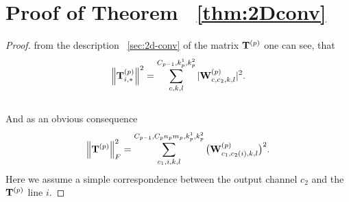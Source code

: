 \documentclass[conference]{IEEEtran}
\begin{document}
\section{Proof of Theorem ~\ref{thm:2Dconv}}\label{app:thm:2Dconv}
\begin{proof}
from the description ~\ref{sec:2d-conv} of the matrix $\mathbf{T}^{(p)}$ one can see, that
\[\left\|\mathbf{T}^{(p)}_{i, *}\right\|^2 = \sum\limits_{c, k, l}^{C_{p-1}, k_p^1, k_p^2}|\mathbf{W}^{(p)}_{c, c_2, k, l}|^2.\] \\
And as an obvious consequence \\
\begin{equation}\label{eq:estim_toep_2d}
\norm{\bT^{(p)}}_F^2 = \sum\limits_{c_1, i, k, l}^{C_{p-1}, C_pn_pm_p, k_p^1, k_p^2}\big(\bW^{(p)}_{c_1, c_2(i), k, l}\big)^2.
\end{equation}
Here we assume a simple correspondence between the output channel $c_2$ and the $\mathbf{T}^{(p)}$ line $i$.


\end{proof}
\end{document}
